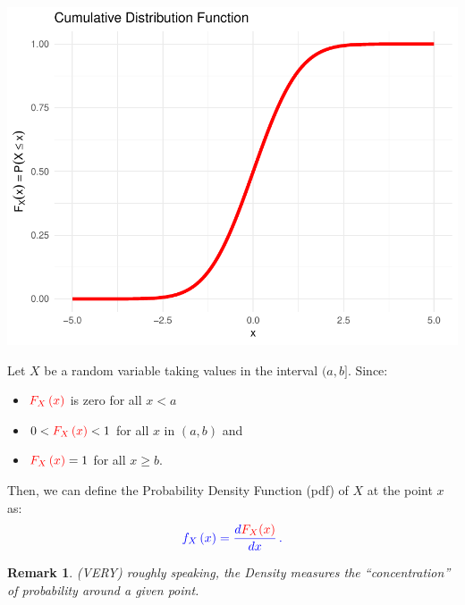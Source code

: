 \documentclass[notes=show,smaller,handout]{beamer}\usepackage[]{graphicx}\usepackage[]{color}
\newenvironment{knitrout}{}{} %
\newtheorem{remark}{Remark}[section]
\begin{document}
\begin{frame}{\secname}
\begin{knitrout}
\color{fgcolor}

{\centering \includegraphics[width=0.8\linewidth]{figure/unnamed-chunk-7-1} 

}



\end{knitrout}
\end{frame}

\begin{frame}{\secname}
  \begin{definition}
  Let $X$ be a random variable taking values in the interval $(a,b]$. Since:
  \medskip

  \begin{itemize}
  \item $\color{red}F_{X}\left( x\right)\color{black} $ is zero for all $x<a$ \medskip
  \item $0<\color{red}F_{X}\left( x\right)\color{black}<1 $ for all $x$ in $(a,b)$ and \medskip
  \item $\color{red}F_{X}\left( x\right)\color{black}=1 $ for all $x\geq b$.
  \end{itemize}

  \medskip

  Then, we can define the Probability Density Function (\color{blue}pdf\color{black}) of $X$ at the point $x$ as:
  \begin{equation*}
  \color{blue}{f_{X}\left( x\right) =\frac{d\color{red}F_{X}(x)\color{black}}{dx}}\,.
  \end{equation*}
  \end{definition}

  \begin{remark}
  (VERY) roughly speaking, the Density measures the ``concentration'' of
  probability around a given point.
  \end{remark}

\end{frame}
\end{document}

